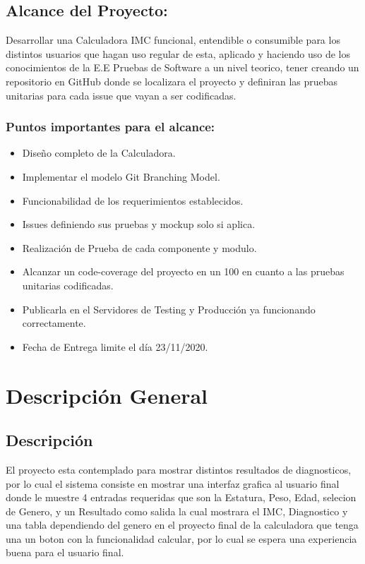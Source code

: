 \documentclass[80pt]{article}
\begin{document}
\subsection{Alcance del Proyecto:}
Desarrollar una Calculadora IMC funcional, entendible o consumible para los distintos usuarios que hagan uso regular de esta, aplicado y haciendo uso de los conocimientos de la E.E Pruebas de Software a un nivel teorico, tener creando un repositorio en GitHub donde se localizara el proyecto y definiran las pruebas unitarias para cada issue que vayan a ser codificadas.

\subsubsection{Puntos importantes para el alcance:}
\begin{itemize}
    \item Diseño completo de la Calculadora.
    \item Implementar el modelo Git Branching Model.
    \item Funcionabilidad de los requerimientos establecidos.
    \item Issues definiendo sus pruebas y mockup solo si aplica.
    \item Realización de Prueba de cada componente y modulo.
    \item Alcanzar un code-coverage del proyecto en un 100 en cuanto a las pruebas unitarias codificadas.
    \item Publicarla en el Servidores de Testing y Producción ya funcionando correctamente.
    \item Fecha de Entrega limite el día 23/11/2020.
\end{itemize}

\section{Descripción General}
\subsection{Descripción}
\vspace{0.5 cm}
El proyecto esta contemplado para mostrar distintos resultados de diagnosticos, por lo cual el sistema consiste en mostrar una interfaz grafica al usuario final donde le muestre 4 entradas requeridas que son la Estatura, Peso, Edad, selecion de Genero,  y un Resultado como salida la cual mostrara el IMC, Diagnostico y una tabla dependiendo del genero en el proyecto final de la calculadora que tenga una un boton con la funcionalidad calcular, por lo cual se espera una experiencia buena para el usuario final. 
\end{document}
